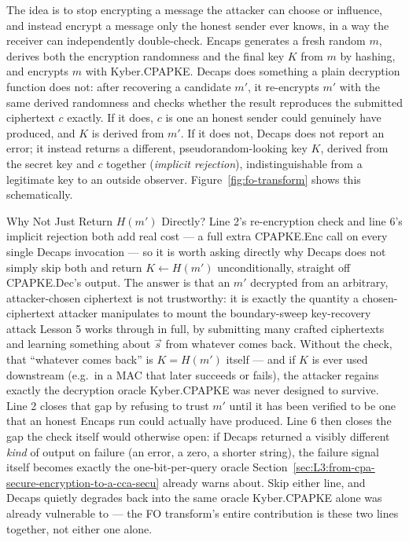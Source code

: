 The idea is to stop encrypting a message the attacker can choose or influence, and instead encrypt a message only the honest sender ever knows, in a way the receiver can independently double-check. Encaps generates a fresh random $m$, derives both the encryption randomness and the final key $K$ from $m$ by hashing, and encrypts $m$ with Kyber.CPAPKE. Decaps does something a plain decryption function does not: after recovering a candidate $m'$, it re-encrypts $m'$ with the same derived randomness and checks whether the result reproduces the submitted ciphertext $c$ exactly. If it does, $c$ is one an honest sender could genuinely have produced, and $K$ is derived from $m'$. If it does not, Decaps does not report an error; it instead returns a different, pseudorandom-looking key $K$, derived from the secret key and $c$ together (\emph{implicit rejection}), indistinguishable from a legitimate key to an outside observer. Figure~\ref{fig:fo-transform} shows this schematically.

\begin{rmkbox}{Why Not Just Return $H(m')$ Directly?}
Line 2's re-encryption check and line 6's implicit rejection both add real cost --- a full extra CPAPKE.Enc call on every single Decaps invocation --- so it is worth asking directly why Decaps does not simply skip both and return $K\gets H(m')$ unconditionally, straight off CPAPKE.Dec's output. The answer is that an $m'$ decrypted from an arbitrary, attacker-chosen ciphertext is not trustworthy: it is exactly the quantity a chosen-ciphertext attacker manipulates to mount the boundary-sweep key-recovery attack Lesson 5 works through in full, by submitting many crafted ciphertexts and learning something about $\vec s$ from whatever comes back. Without the check, that ``whatever comes back'' is $K=H(m')$ itself --- and if $K$ is ever used downstream (e.g.\ in a MAC that later succeeds or fails), the attacker regains exactly the decryption oracle Kyber.CPAPKE was never designed to survive. Line 2 closes that gap by refusing to trust $m'$ until it has been verified to be one that an honest Encaps run could actually have produced. Line 6 then closes the gap the check itself would otherwise open: if Decaps returned a visibly different \emph{kind} of output on failure (an error, a zero, a shorter string), the failure signal itself becomes exactly the one-bit-per-query oracle Section~\ref{sec:L3:from-cpa-secure-encryption-to-a-cca-secu} already warns about. Skip either line, and Decaps quietly degrades back into the same oracle Kyber.CPAPKE alone was already vulnerable to --- the FO transform's entire contribution is these two lines together, not either one alone.
\end{rmkbox}

